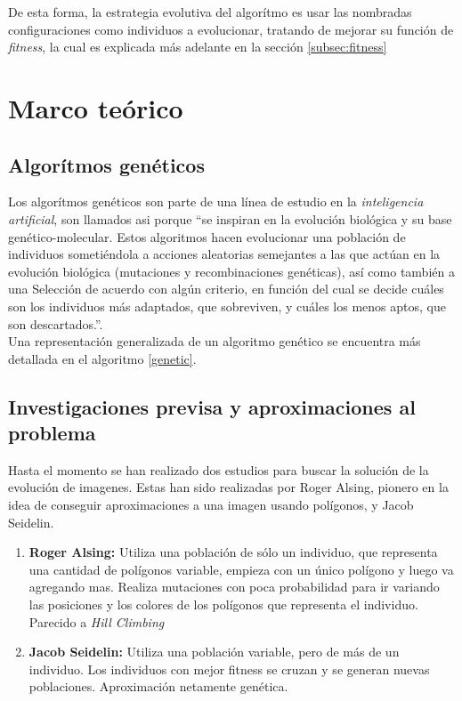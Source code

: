 \documentclass[11pt, spanish]{article}
\begin{document}
De esta forma, la estrategia evolutiva del algorítmo es usar las
nombradas configuraciones como individuos a evolucionar, tratando de
mejorar su función de \emph{fitness}, la cual es explicada más
adelante en la sección \ref{subsec:fitness}

\section{Marco teórico}
\subsection{Algorítmos genéticos}
Los algorítmos genéticos son parte de una línea de estudio en la
\emph{inteligencia artificial}, son llamados asi porque ``se inspiran en
la evolución biológica y su base genético-molecular. Estos algoritmos
hacen evolucionar una población de individuos sometiéndola a acciones
aleatorias semejantes a las que actúan en la evolución biológica
(mutaciones y recombinaciones genéticas), así como también a una
Selección de acuerdo con algún criterio, en función del cual se decide
cuáles son los individuos más adaptados, que sobreviven, y cuáles los
menos aptos, que son descartados.''\cite{wiki}.\\

Una representación generalizada de un algoritmo genético se encuentra más
detallada en el algoritmo \ref{genetic}.

\subsection{Investigaciones previsa y aproximaciones al problema}
Hasta el momento se han realizado dos estudios para buscar la solución
de la evolución de imagenes. Estas han sido realizadas por Roger
Alsing\cite{roger}, pionero en la idea de conseguir aproximaciones a
una imagen usando polígonos, y Jacob Seidelin\cite{jacob}.

\begin{enumerate}
\item \textbf{Roger Alsing:} Utiliza una población de sólo un
  individuo, que representa una cantidad de polígonos variable,
  empieza con un único polígono y luego va agregando mas. Realiza
  mutaciones con poca probabilidad para ir variando las posiciones y
  los colores de los polígonos que representa el individuo. Parecido a
  \emph{Hill Climbing}

\item \textbf{Jacob Seidelin:} Utiliza una población variable, pero de
  más de un individuo. Los individuos con mejor fitness se cruzan y se
  generan nuevas poblaciones. Aproximación netamente genética.
\end{enumerate}
\end{document}
